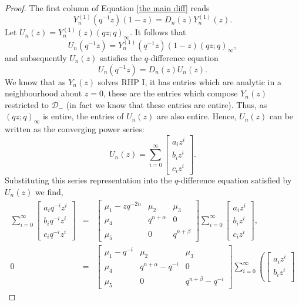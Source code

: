 \documentclass[a4paper,reqno]{amsart}
\numberwithin{equation}{section}
\numberwithin{figure}{section}
\begin{document}
\begin{proof}
    The first column of Equation \eqref{the main diff} reads
    \[ Y_n^{(1)}(q^{-1}z)(1-z) = D_n(z)Y_n^{(1)}(z) .\]
    Let $U_n(z) = Y_n^{(1)}(z)(qz;q)_\infty$. It follows that 
    \[ U_n(q^{-1}z) = Y_n^{(1)}(q^{-1}z)(1-z)(qz;q)_\infty,\]
    and subsequently $U_n(z)$ satisfies the $q$-difference equation
    \[ U_n(q^{-1}z) = D_n(z)U_n(z) .\]
    We know that as $Y_n(z)$ solves RHP I, it has entries which are analytic in a neighbourhood about $z=0$, these are the entries which compose $Y_n(z)$ restricted to $\mathcal{D}_-$ (in fact we know that these entries are entire). Thus, as $(qz;q)_\infty$ is entire, the entries of $U_n(z)$ are also entire. Hence, $U_n(z)$ can be written as the converging power series:
\begin{equation}
    U_n(z) =  \sum_{i=0}^\infty\begin{bmatrix}
   a_i z^i\\
   b_i z^i\\
    c_i z^i
\end{bmatrix}.
\end{equation}
Substituting this series representation into the $q$-difference equation satisfied by $U_n(z)$ we find,
\begin{eqnarray*}
   \sum_{i=0}^\infty\begin{bmatrix}
   a_i q^{-i}z^i\\
   b_i q^{-i}z^i\\
    c_i q^{-i}z^i
 \end{bmatrix}&=& \begin{bmatrix}
    \mu_{1}-zq^{-2n} & \mu_{2} &\mu_{3}\\
   \mu_{4}&q^{n+\alpha}&0 \\
   \mu_{5}&0&q^{n+\beta}
   \end{bmatrix}\sum_{i=0}^\infty\begin{bmatrix}
   a_i z^i\\
   b_i z^i\\
    c_i z^i
 \end{bmatrix},\\
 0
 &=& \begin{bmatrix}
    \mu_{1}-q^{-i} & \mu_{2} &\mu_{3}\\
   \mu_{4}&q^{n+\alpha}-q^{-i}&0 \\
   \mu_{5}&0&q^{n+\beta}-q^{-i}
   \end{bmatrix}\sum_{i=0}^\infty\left(\begin{bmatrix}
   a_i z^i\\
   b_i z^i\\

\end{bmatrix}
\end{eqnarray*}
\end{proof}
\end{document}

